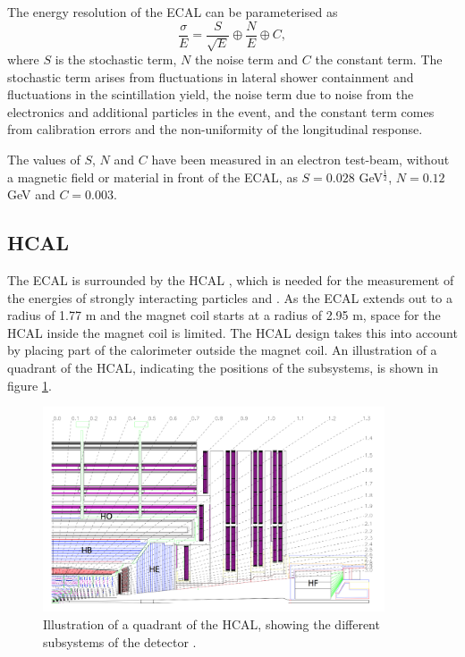 The energy resolution of the \ac{ECAL} can be parameterised as
\begin{equation}\label{eqn:ecalres}
\frac{\sigma}{E} = \frac{S}{\sqrt{E}}\oplus\frac{N}{E}\oplus C,
\end{equation}
where $S$ is the stochastic term, $N$ the noise term and $C$ the constant term.
The stochastic term arises from fluctuations in lateral shower containment and 
fluctuations in the scintillation yield, the noise term due to noise from the electronics
and additional particles in the event, and the constant term comes
from calibration errors and the non-uniformity of the longitudinal response.

The values of $S$, $N$ and $C$ have been measured in an electron
test-beam, without a magnetic field or material in front of the \ac{ECAL}, as 
$S = 0.028$ GeV$^{\frac{1}{2}}$, $N = 0.12$ GeV and $C= 0.003$.



\subsection{\acl{HCAL}}
\label{sec:CMSLHC_CMS_hcal}
The \ac{ECAL} is surrounded by the \ac{HCAL} \cite{cms-jinst}, which is needed for the
measurement of the energies of strongly interacting particles and \MET. As
the \ac{ECAL} extends out to a radius of 1.77 m and the magnet coil
starts at a radius of 2.95 m, space for the \ac{HCAL} inside the magnet
coil is limited. The \ac{HCAL} design takes
this into account by placing part of the calorimeter outside the magnet coil. An
illustration of a quadrant of the
\ac{HCAL}, indicating the positions of the subsystems, is shown
in figure \ref{fig:CMS_HCAL}.

\begin{figure}[h!]
\begin{center}
\includegraphics[width=0.9\textwidth]{./Detector/Plots/HCAL.png}
\caption[Illustration of a quadrant of the HCAL, showing the different
subsystems of the detector.]{Illustration of a quadrant of the \ac{HCAL}, showing the different
subsystems of the detector \cite{cms-jinst}.}
\label{fig:CMS_HCAL}
\end{center}
\end{figure}

